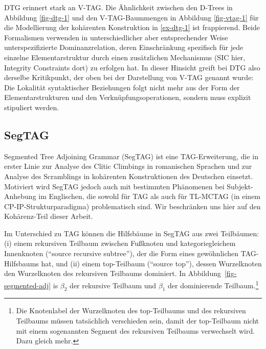 DTG erinnert stark an V-TAG. Die Ähnlichkeit zwischen den D-Trees in Abbildung \ref{fig-dtg-1} und den V-TAG-Baummengen in Abbildung \ref{fig-vtag-1} für die Modellierung der kohärenten Konstruktion in \ref{ex-dtg-1} ist frappierend. Beide Formalismen verwenden in unterschiedlicher aber entsprechender Weise unterspezifizierte Dominanzrelation, deren Einschränkung spezifisch für jede einzelne Elementarstruktur durch einen zusätzlichen Mechanismus (SIC hier, Integrity Constraints dort) zu erfolgen hat. In dieser Hinsicht greift bei DTG also derselbe Kritikpunkt, der oben bei der Darstellung von V-TAG genannt wurde: Die Lokalität syntaktischer Beziehungen folgt nicht mehr aus der Form der Elementarstrukturen und den Verknüpfungsoperationen, sondern muss explizit stipuliert werden.  


\subsection{SegTAG}

Segmented Tree Adjoining Grammar (SegTAG) ist eine TAG-Erweiterung, die \cite{Kulick:00} in erster Linie zur Analyse des Clitic Climbings in romanischen Sprachen und zur Analyse des Scramblings in kohärenten Konstruktionen des Deutschen einsetzt. Motiviert wird SegTAG jedoch auch mit bestimmten Phänomenen bei Subjekt-Anhebung im Englischen, die sowohl für TAG als auch für TL-MCTAG (in einem CP-IP-Strukturparadigma) problematisch sind. Wir beschränken uns hier auf den Kohärenz-Teil dieser Arbeit.

Im Unterschied zu TAG können die Hilfsbäume in SegTAG aus zwei Teilbäumen: (i) einem rekursiven Teilbaum zwischen Fuß\-knoten und kategoriegleichem Innenknoten ("`source recursive subtree"'), der die Form eines gewöhnlichen TAG-Hilfs\-baums hat, und (ii) einem top-Teilbaum ("`source top"'), dessen Wurzelknoten den Wurzelknoten des rekursiven Teilbaums dominiert. In Abbildung~\ref{fig-segmented-adj} is $\beta_2$ der rekursive Teilbaum und $\beta_1$ der dominierende Teilbaum.\footnote{Die Knotenlabel der Wurzelknoten des top-Teilbaums und des rekursiven Teilbaums müssen tatsächlich verschieden sein, damit der top-Teilbaum nicht mit einem sogenannten Segment des rekursiven Teilbaums verwechselt wird. Dazu gleich mehr.}  

